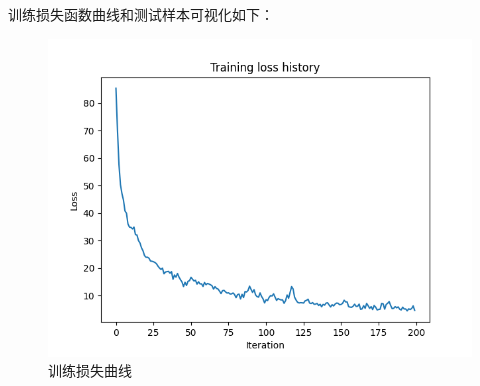 \documentclass{article}%
\begin{document}
训练损失函数曲线和测试样本可视化如下：
\begin{figure}[H]
	\centering
    \includegraphics[width=0.7\linewidth]{fast_rcnn_overfit_small/training_loss.png}
    \caption{训练损失曲线}
\end{figure}
\end{document}
